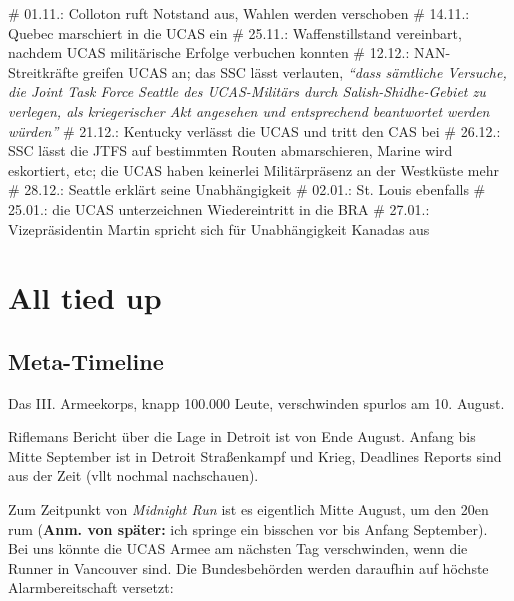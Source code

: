\begin{easylist}
    # 01.11.: Colloton ruft Notstand aus, Wahlen werden verschoben
    # 14.11.: Quebec marschiert in die UCAS ein
    # 25.11.: Waffenstillstand vereinbart, nachdem UCAS militärische Erfolge verbuchen konnten
    # 12.12.: NAN-Streitkräfte greifen UCAS an; das SSC lässt verlauten, \textit{``dass sämtliche Versuche, die Joint Task Force Seattle des UCAS-Militärs durch Salish-Shidhe-Gebiet zu verlegen, als kriegerischer Akt angesehen und entsprechend beantwortet werden würden''}
    # 21.12.: Kentucky verlässt die UCAS und tritt den CAS bei
    # 26.12.: SSC lässt die JTFS auf bestimmten Routen abmarschieren, Marine wird eskortiert, etc; die UCAS haben keinerlei Militärpräsenz an der Westküste mehr
    # 28.12.: Seattle erklärt seine Unabhängigkeit
    # 02.01.: St. Louis ebenfalls
    # 25.01.: die UCAS unterzeichnen Wiedereintritt in die BRA
    # 27.01.: Vizepräsidentin Martin spricht sich für Unabhängigkeit Kanadas aus
\end{easylist}

%








\section{All tied up}

\subsection{Meta-Timeline}

Das III. Armeekorps, knapp 100.000 Leute, verschwinden spurlos am 10. August.

Riflemans Bericht über die Lage in Detroit ist von Ende August. Anfang bis Mitte September ist in Detroit Straßenkampf und Krieg, Deadlines Reports sind aus der Zeit (vllt nochmal nachschauen).

Zum Zeitpunkt von \textit{Midnight Run} ist es eigentlich Mitte August, um den 20en rum (\textbf{Anm. von später:} ich springe ein bisschen vor bis Anfang September). Bei uns könnte die UCAS Armee am nächsten Tag verschwinden, wenn die Runner in Vancouver sind. Die Bundesbehörden werden daraufhin auf höchste Alarmbereitschaft versetzt:

